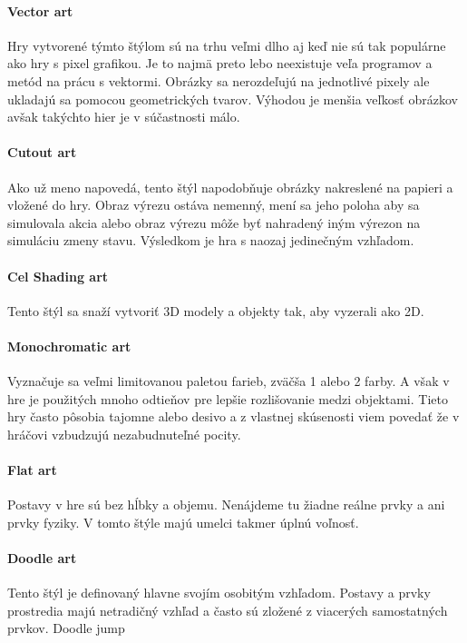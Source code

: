 \documentclass[10pt,twoside,slovak,a4paper]{article}
\begin{document}
\paragraph{Vector art}
Hry vytvorené týmto štýlom sú na trhu veľmi dlho aj keď nie sú tak populárne ako hry s pixel grafikou. Je to najmä preto lebo neexistuje veľa programov a metód na prácu s vektormi. Obrázky sa nerozdeľujú na jednotlivé pixely ale ukladajú sa pomocou geometrických tvarov. Výhodou je menšia veľkosť obrázkov avšak takýchto hier je v súčastnosti málo.

\paragraph{Cutout art}
Ako už meno napovedá, tento štýl napodobňuje obrázky nakreslené na papieri a vložené do hry. Obraz výrezu ostáva nemenný, mení sa jeho poloha aby sa simulovala akcia alebo obraz výrezu môže byť nahradený iným výrezon na simuláciu zmeny stavu. Výsledkom je hra s naozaj jedinečným vzhľadom.


\paragraph{Cel Shading art}
Tento štýl sa snaží vytvoriť 3D modely a objekty tak, aby vyzerali ako 2D.


\paragraph{Monochromatic art}
Vyznačuje sa veľmi limitovanou paletou farieb, zväčša 1 alebo 2 farby. A však v hre je použitých mnoho odtieňov pre lepšie rozlišovanie medzi objektami. Tieto hry často pôsobia tajomne alebo desivo a z vlastnej skúsenosti viem povedať že v hráčovi vzbudzujú nezabudnuteľné pocity.

\paragraph{Flat art}
Postavy v hre sú bez hĺbky a objemu. Nenájdeme tu žiadne reálne prvky a ani prvky fyziky. V tomto štýle majú umelci takmer úplnú voľnosť.

\paragraph{Doodle art}
Tento štýl je definovaný hlavne svojím osobitým vzhľadom. Postavy a prvky prostredia majú netradičný vzhľad a často sú zložené z viacerých samostatných prvkov.
Doodle jump
\end{document}
